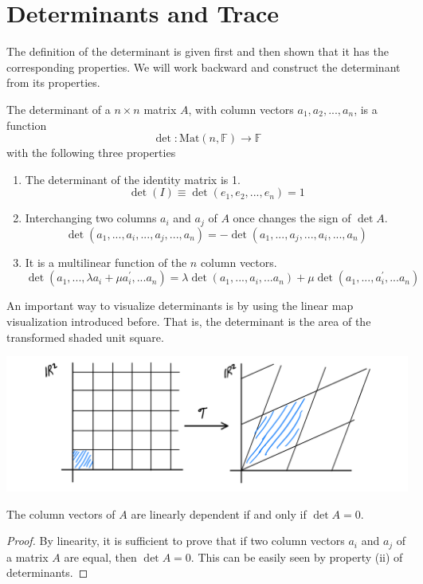 \section{Determinants and Trace}

  The definition of the determinant is given first and then shown that it has the corresponding properties. We will work backward and construct the determinant from its properties. 

  \begin{definition}
  The determinant of a $n \times n$ matrix $A$, with column vectors $a_1, a_2, ..., a_n$, is a function
  \[\det: \text{Mat}(n, \mathbb{F}) \longrightarrow \mathbb{F}\]
  with the following three properties
  \begin{enumerate}
      \item The determinant of the identity matrix is 1. 
  \[\det{(I)} \equiv \det{(e_1, e_2, ..., e_n)} = 1\]
      \item Interchanging two columns $a_i$ and $a_j$ of $A$ once changes the sign of $\det{A}$. 
  \[\det{(a_1, ..., a_i, ..., a_j, ..., a_n)} = -\det{(a_1, ..., a_j, ..., a_i, ..., a_n)}\]
      \item It is a multilinear function of the $n$ column vectors. 
  \[\det{(a_1, ..., \lambda a_i + \mu a_i^\prime, ... a_n)} = \lambda \det{(a_1, ..., a_i, ... a_n)} + \mu \det{(a_1, ..., a_i^\prime, ... a_n)} \]
  \end{enumerate}
  \end{definition}

  An important way to visualize determinants is by using the linear map visualization introduced before. That is, the determinant is the area of the transformed shaded unit square. 
  \begin{center}
      \includegraphics[scale=0.25]{img/Determinant.PNG}
  \end{center}

  \begin{proposition}
  The column vectors of $A$ are linearly dependent if and only if $\det{A} = 0$. 
  \end{proposition}
  \begin{proof}
  By linearity, it is sufficient to prove that if two column vectors $a_i$ and $a_j$ of a matrix $A$ are equal, then $\det{A} = 0$. This can be easily seen by property (ii) of determinants. 
  \end{proof}

